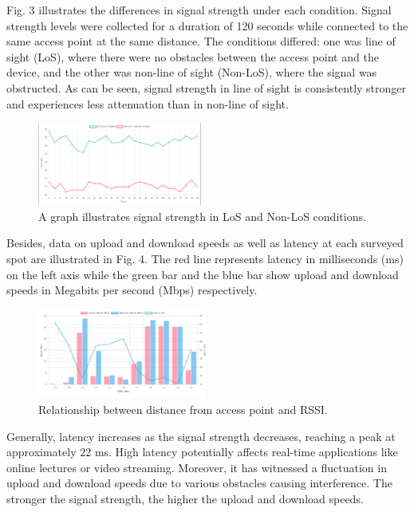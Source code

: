 \documentclass[conference]{IEEEtran}
\begin{document}
Fig. 3 illustrates the differences in signal strength under each condition. Signal strength levels were collected for a duration of 120 seconds while connected to the same access point at the same distance. The conditions differed: one was line of sight (LoS), where there were no obstacles between the access point and the device, and the other was non-line of sight (Non-LoS), where the signal was obstructed. As can be seen, signal strength in line of sight is consistently stronger and experiences less attenuation than in non-line of sight.
\vspace{120}

\begin{figure}[htbp]
    \centering
    \includegraphics[width=0.48\textwidth]{los_nonlos.png}
    \caption{A graph illustrates signal strength in LoS and Non-LoS conditions.}
    \label{fig:los_nonlos}
\end{figure}

Besides, data on upload and download speeds as well as latency at each surveyed spot are illustrated in Fig. 4. The red line represents latency in milliseconds (ms) on the left axis while the green bar and the blue bar show upload and download speeds in Megabits per second (Mbps) respectively.


\begin{figure}[htbp]
    \centering
    \includegraphics[width=0.5\textwidth]{speech_test.png}
    \caption{Relationship between distance from access point and RSSI.}
\end{figure}

Generally, latency increases as the signal strength decreases, reaching a peak at approximately 22 ms. High latency potentially affects real-time applications like online lectures or video streaming. Moreover, it has witnessed a fluctuation in upload and download speeds due to various obstacles causing interference. The stronger the signal strength, the higher the upload and download speeds.
\end{document}
